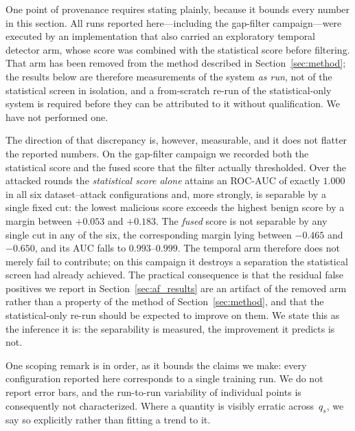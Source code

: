 \documentclass[journal]{IEEEtran}
\begin{document}
One point of provenance requires stating plainly, because it bounds every number in this section. All runs reported here---including the gap-filter campaign---were executed by an implementation that also carried an exploratory temporal detector arm, whose score was combined with the statistical score before filtering. That arm has been removed from the method described in Section~\ref{sec:method}; the results below are therefore measurements of the system \emph{as run}, not of the statistical screen in isolation, and a from-scratch re-run of the statistical-only system is required before they can be attributed to it without qualification. We have not performed one.

The direction of that discrepancy is, however, measurable, and it does not flatter the reported numbers. On the gap-filter campaign we recorded both the statistical score and the fused score that the filter actually thresholded. Over the attacked rounds the \emph{statistical score alone} attains an ROC-AUC of exactly $1.000$ in all six dataset--attack configurations and, more strongly, is separable by a single fixed cut: the lowest malicious score exceeds the highest benign score by a margin between $+0.053$ and $+0.183$. The \emph{fused} score is not separable by any single cut in any of the six, the corresponding margin lying between $-0.465$ and $-0.650$, and its AUC falls to $0.993$--$0.999$. The temporal arm therefore does not merely fail to contribute; on this campaign it destroys a separation the statistical screen had already achieved. The practical consequence is that the residual false positives we report in Section~\ref{sec:af_results} are an artifact of the removed arm rather than a property of the method of Section~\ref{sec:method}, and that the statistical-only re-run should be expected to improve on them. We state this as the inference it is: the separability is measured, the improvement it predicts is not.

One scoping remark is in order, as it bounds the claims we make: every configuration reported here corresponds to a single training run. We do not report error bars, and the run-to-run variability of individual points is consequently not characterized. Where a quantity is visibly erratic across~$q_s$, we say so explicitly rather than fitting a trend to it.
\end{document}
